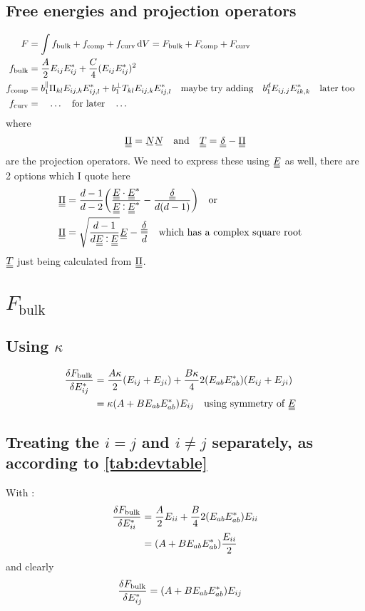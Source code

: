 \documentclass[11pt]{article}
\begin{document}
\subsection{Free energies and projection operators}
\begin{align}
    F & = \int f_\text{bulk} + f_\text{comp} + f_\text{curv} \dd{V} = F_\text{bulk} + F_\text{comp} + F_\text{curv}\\
    f_\text{bulk} & = \frac{A}{2} E_{ij}E_{ij}^* + \frac{C}{4} (E_{ij}E_{ij}^*)^2 \\
    f_\text{comp} & = b_1^\parallel \Pi_{kl} E_{ij,k}E_{ij,l}^* + b_1^\perp T_{kl} E_{ij,k}E_{ij,l}^* \qq{maybe try adding} b_1^d E_{ij,j}E_{ik,k}^* \qq{later too} \\
    f_\text{curv} & = \quad \ldots \qq{for later} \ldots \\
\end{align}
where
\begin{align}
    \du{\Pi} = \su{N} \su{N} && \text{and} && \du{T} = \du{\delta} - \du{\Pi}
\end{align}
are the projection operators. We need to express these using $\du{E}$ as well, there are 2 options which I quote here
\begin{align}
    \du{\Pi} & = \frac{d-1}{d-2}\qty(\frac{\du{E} \cdot \du{E}^*}{\du{E} \cddot \du{E}^*} - \frac{\du{\delta}}{d(d-1)}) \qq{or} \label{eq:piex1}\\
    \du{\Pi} & = \sqrt{\frac{d-1}{d \du{E} \cddot \du{E}}} \du{E} - \frac{\du{\delta}}{d} \label{eq:piex2} \qq{which has a complex square root}
\end{align}
$\du{T}$ just being calculated from $\du{\Pi}$.

\section{$F_\text{bulk}$}
\subsection{Using $\kappa$}
\begin{align}
    \fdv{F_\text{bulk}}{E_{ij}^*} &= \frac{A\kappa}{2}(E_{ij} + E_{ji}) + \frac{B\kappa}{4} 2(E_{ab}E_{ab}^*)(E_{ij}+E_{ji}) \\
    &= \kappa(A + B E_{ab}E_{ab}^*) E_{ij} \qq{using symmetry of \EE}
\end{align}

\subsection{Treating the $i=j$ and $i\neq j$ separately, as according to \cref{tab:devtable}}
With :
\begin{align}
    \fdv{F_\text{bulk}}{E_{ii}^*} &= \frac{A}{2}E_{ii} + \frac{B}{4} 2(E_{ab}E_{ab}^*)E_{ii} \\
    &= (A + B E_{ab}E_{ab}^*)\frac{E_{ii}}{2}
\end{align}
and clearly
\begin{align}
    \fdv{F_\text{bulk}}{E_{ij}^*} &= (A + B E_{ab}E_{ab}^*) E_{ij}
\end{align}
\end{document}
